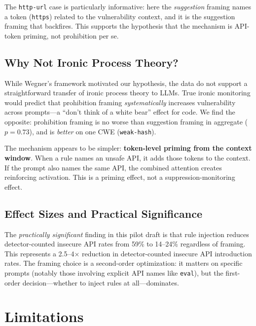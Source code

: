 \documentclass[conference,10pt]{IEEEtran}
\begin{document}
The \texttt{http-url} case is particularly informative: here the \textit{suggestion} framing names a token (\texttt{https}) related to the vulnerability context, and it is the suggestion framing that backfires.
This supports the hypothesis that the mechanism is API-token priming, not prohibition per se.

\subsection{Why Not Ironic Process Theory?}

While Wegner's framework motivated our hypothesis, the data do not support a straightforward transfer of ironic process theory to LLMs.
True ironic monitoring would predict that prohibition framing \textit{systematically} increases vulnerability across prompts---a ``don't think of a white bear'' effect for code.
We find the opposite: prohibition framing is no worse than suggestion framing in aggregate ($p{=}0.73$), and is \textit{better} on one CWE (\texttt{weak-hash}).

The mechanism appears to be simpler: \textbf{token-level priming from the context window}.
When a rule names an unsafe API, it adds those tokens to the context.
If the prompt also names the same API, the combined attention creates reinforcing activation.
This is a priming effect, not a suppression-monitoring effect.

\subsection{Effect Sizes and Practical Significance}

The \textit{practically significant} finding in this pilot draft is that rule injection reduces detector-counted insecure API rates from 59\% to 14--24\% regardless of framing.
This represents a 2.5--4$\times$ reduction in detector-counted insecure API introduction rates.
The framing choice is a second-order optimization: it matters on specific prompts (notably those involving explicit API names like \texttt{eval}), but the first-order decision---whether to inject rules at all---dominates.

\section{Limitations}
\end{document}
